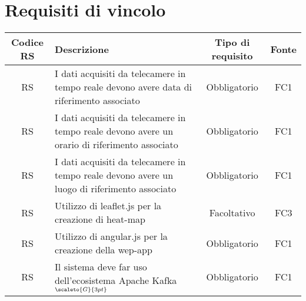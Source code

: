 {\section{Requisiti di vincolo}

\begin{center}
	\renewcommand{\arraystretch}{1.4}
	\begin{tabularx}{\textwidth}{ |c|X|c|c| }
		\hline
		\rowcolor{Melon}
		\textbf{Codice RS} & \textbf{Descrizione} & \textbf{Tipo di requisito} & \textbf{Fonte} \\
			\hline
		RS  & I dati acquisiti da telecamere in tempo reale devono avere data di riferimento associato  &Obbligatorio & FC1 \\
		\hline
		RS  & I dati acquisiti da telecamere in tempo reale devono avere un orario di riferimento associato &Obbligatorio & FC1 \\
		\hline
		RS  & I dati acquisiti da telecamere in tempo reale devono avere un luogo di riferimento associato &Obbligatorio  & FC1 \\
		\hline
		RS  & Utilizzo di leaflet.js per la creazione di heat-map & Facoltativo & FC3 \\
	\hline
		RS  & Utilizzo di angular.js per la creazione della wep-app  & Obbligatorio  & FC1 \\
\hline
RS  & Il sistema deve far uso dell'ecosistema Apache Kafka$_{\scaleto{G}{3pt}}$ & Obbligatorio  & FC1 \\
	\end{tabularx}
\end{center}



}
